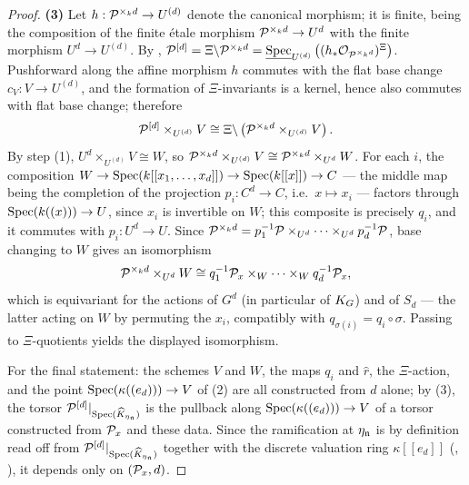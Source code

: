 \begin{proof}
    \textbf{(3)} Let $h : \mathcal{P}^{\times_k d} \to U^{(d)}$ denote the canonical morphism; it is finite, being the composition
    of the finite étale morphism $\mathcal{P}^{\times_k d} \to U^d$ with the finite morphism $U^d \to U^{(d)}$. By
    ,
    $\mathcal{P}^{[d]} = \Xi \backslash \mathcal{P}^{\times_k d} = \underline{\operatorname{Spec}}_{U^{(d)}}\left((h_* \mathcal{O}_{\mathcal{P}^{\times_k d}})^{\Xi}\right)$.
    Pushforward along the affine morphism $h$ commutes with the flat base change $c_V : V \to U^{(d)}$, and the formation of
    $\Xi$-invariants is a kernel, hence also commutes with flat base change; therefore
    $$ \mathcal{P}^{[d]} \times_{U^{(d)}} V \cong \Xi \backslash \left(\mathcal{P}^{\times_k d} \times_{U^{(d)}} V\right).$$
    By step (1), $U^d \times_{U^{(d)}} V \cong W$, so
    $\mathcal{P}^{\times_k d} \times_{U^{(d)}} V \cong \mathcal{P}^{\times_k d} \times_{U^d} W$.
    For each $i$, the composition $W \to \operatorname{Spec}(k[[x_1, \dots, x_d]]) \to \operatorname{Spec}(k[[x]]) \to C$ --- the middle map being the
    completion of the projection $p_i : C^d \to C$, i.e.\ $x \mapsto x_i$ --- factors through $\operatorname{Spec}(k((x))) \to U$, since
    $x_i$ is invertible on $W$; this composite is precisely $q_i$, and it commutes with $p_i : U^d \to U$. Since
    $\mathcal{P}^{\times_k d} = p_1^{-1}\mathcal{P} \times_{U^d} \cdots \times_{U^d} p_d^{-1}\mathcal{P}$, base changing to $W$ gives an isomorphism
    $$ \mathcal{P}^{\times_k d} \times_{U^d} W \cong q_1^{-1}\mathcal{P}_x \times_W \cdots \times_W q_d^{-1}\mathcal{P}_x, $$
    which is equivariant for the actions of $G^d$ (in particular of $K_{G}$) and of $S_d$ --- the latter acting on $W$ by
    permuting the $x_i$, compatibly with $q_{\sigma(i)} = q_i \circ \sigma$. Passing to $\Xi$-quotients yields the displayed
    isomorphism.

    For the final statement: the schemes $V$ and $W$, the maps $q_i$ and $\hat{r}$, the $\Xi$-action, and the point
    $\operatorname{Spec}(\kappa((e_d))) \to V$ of (2) are all constructed from $d$ alone; by (3), the torsor
    $\mathcal{P}^{[d]}|_{\operatorname{Spec}(\widehat{K}_{\eta_{\mathfrak{n}}})}$ is the pullback along $\operatorname{Spec}(\kappa((e_d))) \to V$ of a torsor constructed
    from $\mathcal{P}_x$ and these data. Since the ramification at $\eta_{\mathfrak{n}}$ is by definition read off from
    $\mathcal{P}^{[d]}|_{\operatorname{Spec}(\widehat{K}_{\eta_{\mathfrak{n}}})}$ together with the discrete valuation ring $\kappa[[e_d]]$
    (, ), it depends only on
    $(\mathcal{P}_x, d)$.
\end{proof}

